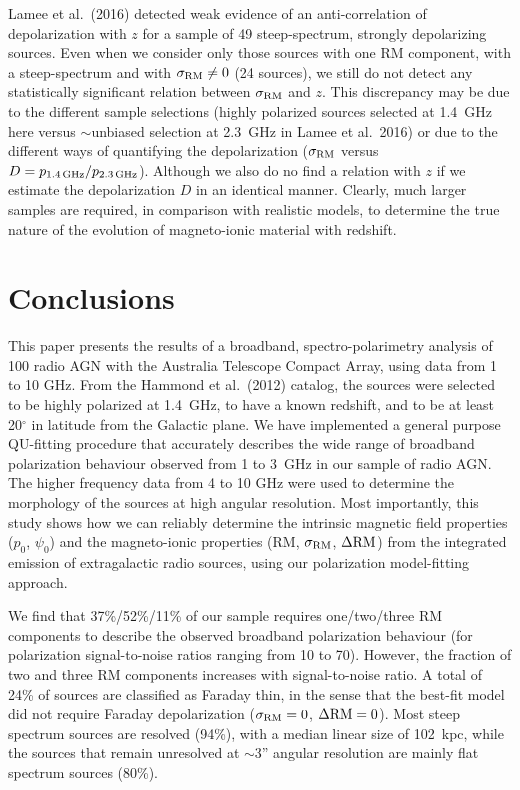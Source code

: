 \documentclass{mnras}
\newcommand*\sigmaRM{\sigma_{\rm RM}}
\newcommand*\DeltaRM{\Delta{\rm RM}}
\begin{document}
Lamee et al.~(2016) detected weak evidence of an anti-correlation of depolarization with $z$ for a sample of 49 steep-spectrum, strongly depolarizing sources. Even when we consider only those sources with one RM component, with a steep-spectrum and with $\sigmaRM \ne 0$ (24 sources), we still do not detect any statistically significant relation between $\sigmaRM$ and $z$. This discrepancy may be due to the different sample selections (highly polarized sources selected at 1.4~GHz here versus $\sim$unbiased selection at 2.3~GHz in Lamee et al.~2016) or due to the different ways of quantifying the depolarization ($\sigmaRM$ versus $D=p_{1.4\,{\rm GHz}} / p_{2.3\,{\rm GHz}}$). Although we also do no find a relation with $z$ if we estimate the depolarization $D$ in an identical manner. 
Clearly, much larger samples are required, in comparison with realistic models, to determine the true nature of the evolution of magneto-ionic material with redshift. 

\section{Conclusions}
This paper presents the results of a broadband, spectro-polarimetry analysis of 100 radio AGN with the Australia Telescope Compact Array, using data from 1 to 10 GHz. From the Hammond et al.~(2012) catalog, the sources were selected to be highly polarized at 1.4~GHz, to have a known redshift, and to be at least 20$^\circ$ in latitude from the Galactic plane. 
We have implemented a general purpose QU-fitting procedure that accurately describes the wide range of broadband polarization behaviour observed from 1 to 3~GHz in our sample of radio AGN. The higher frequency data from 4 to 10 GHz were used to determine the morphology of the sources at high angular resolution. Most importantly, this study shows how we can reliably determine the intrinsic magnetic field properties ($p_0$, $\psi_0$) and the magneto-ionic properties (RM, $\sigmaRM$, $\DeltaRM$) from the integrated emission of extragalactic radio sources, using our polarization model-fitting approach.

We find that 37\%/52\%/11\% of our sample requires one/two/three RM components to describe the observed broadband polarization behaviour (for polarization signal-to-noise ratios ranging from 10 to 70). However, the fraction of two and three RM components increases with signal-to-noise ratio. A total of 24\% of sources are classified as Faraday thin, in the sense that the best-fit model did not require Faraday depolarization ($\sigmaRM=0$, $\DeltaRM=0$).  
Most steep spectrum sources are resolved (94\%), with a median linear size of 102~kpc, while the sources that remain unresolved at $\sim$3'' angular resolution are mainly flat spectrum sources (80\%). 
\end{document}
